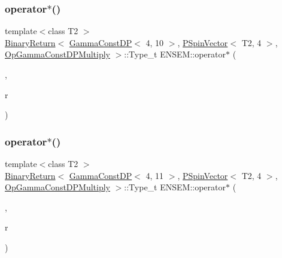 \subsubsection{\texorpdfstring{operator$\ast$()}{operator*()}\hspace{0.1cm}{\footnotesize\ttfamily [27/32]}}
{\footnotesize\ttfamily template$<$class T2 $>$ \\
\mbox{\hyperlink{structENSEM_1_1BinaryReturn}{Binary\+Return}}$<$ \mbox{\hyperlink{classENSEM_1_1GammaConstDP}{Gamma\+Const\+DP}}$<$ 4, 10 $>$, \mbox{\hyperlink{classENSEM_1_1PSpinVector}{P\+Spin\+Vector}}$<$ T2, 4 $>$, \mbox{\hyperlink{structENSEM_1_1OpGammaConstDPMultiply}{Op\+Gamma\+Const\+D\+P\+Multiply}} $>$\+::Type\+\_\+t E\+N\+S\+E\+M\+::operator$\ast$ (\begin{DoxyParamCaption}\item[{const \mbox{\hyperlink{classENSEM_1_1GammaConstDP}{Gamma\+Const\+DP}}$<$ 4, 10 $>$ \&}]{,  }\item[{const \mbox{\hyperlink{classENSEM_1_1PSpinVector}{P\+Spin\+Vector}}$<$ T2, 4 $>$ \&}]{r }\end{DoxyParamCaption})\hspace{0.3cm}{\ttfamily [inline]}}

\mbox{\label{group__primspinvector_gad1bc0eb5b6f881a32c6fda1e7b14d083}} 
\subsubsection{\texorpdfstring{operator$\ast$()}{operator*()}\hspace{0.1cm}{\footnotesize\ttfamily [28/32]}}
{\footnotesize\ttfamily template$<$class T2 $>$ \\
\mbox{\hyperlink{structENSEM_1_1BinaryReturn}{Binary\+Return}}$<$ \mbox{\hyperlink{classENSEM_1_1GammaConstDP}{Gamma\+Const\+DP}}$<$ 4, 11 $>$, \mbox{\hyperlink{classENSEM_1_1PSpinVector}{P\+Spin\+Vector}}$<$ T2, 4 $>$, \mbox{\hyperlink{structENSEM_1_1OpGammaConstDPMultiply}{Op\+Gamma\+Const\+D\+P\+Multiply}} $>$\+::Type\+\_\+t E\+N\+S\+E\+M\+::operator$\ast$ (\begin{DoxyParamCaption}\item[{const \mbox{\hyperlink{classENSEM_1_1GammaConstDP}{Gamma\+Const\+DP}}$<$ 4, 11 $>$ \&}]{,  }\item[{const \mbox{\hyperlink{classENSEM_1_1PSpinVector}{P\+Spin\+Vector}}$<$ T2, 4 $>$ \&}]{r }\end{DoxyParamCaption})\hspace{0.3cm}{\ttfamily [inline]}}


